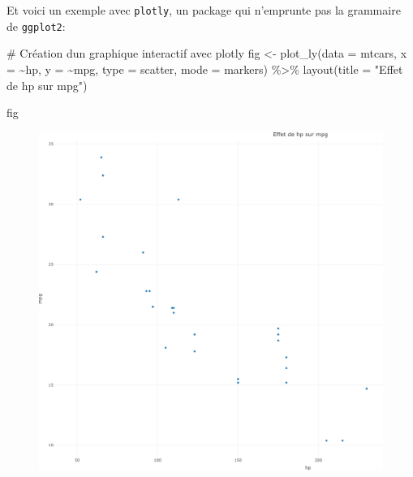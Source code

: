 \documentclass[
  letterpaper,
  DIV=11,
  numbers=noendperiod]{scrreprt}
\newenvironment{Shaded}{\begin{snugshade}}{\end{snugshade}}
\newcommand{\AttributeTok}[1]{\textcolor[rgb]{0.40,0.45,0.13}{#1}}
\newcommand{\CommentTok}[1]{\textcolor[rgb]{0.37,0.37,0.37}{#1}}
\newcommand{\FunctionTok}[1]{\textcolor[rgb]{0.28,0.35,0.67}{#1}}
\newcommand{\NormalTok}[1]{\textcolor[rgb]{0.00,0.23,0.31}{#1}}
\newcommand{\OtherTok}[1]{\textcolor[rgb]{0.00,0.23,0.31}{#1}}
\newcommand{\SpecialCharTok}[1]{\textcolor[rgb]{0.37,0.37,0.37}{#1}}
\newcommand{\StringTok}[1]{\textcolor[rgb]{0.13,0.47,0.30}{#1}}
\begin{document}
Et voici un exemple avec \texttt{plotly}, un package qui n'emprunte pas
la grammaire de \texttt{ggplot2}:

\begin{Shaded}
\begin{Highlighting}[]
\CommentTok{\# Création d\textquotesingle{}un graphique interactif avec plotly}
\NormalTok{fig }\OtherTok{\textless{}{-}} \FunctionTok{plot\_ly}\NormalTok{(}\AttributeTok{data =}\NormalTok{ mtcars, }\AttributeTok{x =} \SpecialCharTok{\textasciitilde{}}\NormalTok{hp, }\AttributeTok{y =} \SpecialCharTok{\textasciitilde{}}\NormalTok{mpg, }\AttributeTok{type =} \StringTok{\textquotesingle{}scatter\textquotesingle{}}\NormalTok{, }\AttributeTok{mode =} \StringTok{\textquotesingle{}markers\textquotesingle{}}\NormalTok{) }\SpecialCharTok{\%\textgreater{}\%}
  \FunctionTok{layout}\NormalTok{(}\AttributeTok{title =} \StringTok{"Effet de hp sur mpg"}\NormalTok{)}

\NormalTok{fig}
\end{Highlighting}
\end{Shaded}

\begin{figure}[H]

{\centering \includegraphics{chapitre_6_files/figure-pdf/unnamed-chunk-14-1.pdf}

}

\end{figure}
\end{document}
